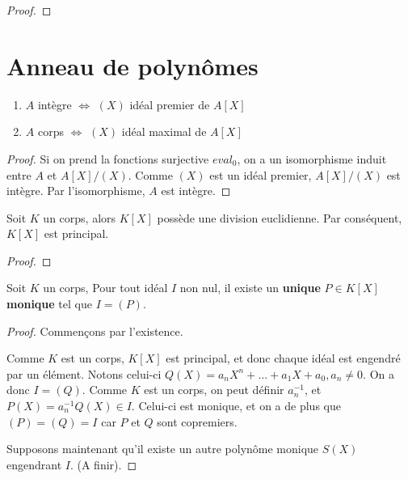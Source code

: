 \begin{proof}
	
\end{proof}
\section{Anneau de polynômes}

\begin{proposition}
	\begin{enumerate}
		\item $A$ intègre $\Leftrightarrow$ $(X)$ idéal premier de $A[X]$
		\item $A$ corps $\Leftrightarrow$ $(X)$ idéal maximal de $A[X]$
	\end{enumerate}
\end{proposition}

\begin{proof}
	Si on prend la fonctions surjective $eval_{0}$, on a un isomorphisme induit
	entre $A$ et $A[X]/(X)$. Comme $(X)$ est un idéal premier, $A[X]/(X)$ est
	intègre. Par l'isomorphisme, $A$ est intègre.
\end{proof}

\begin{proposition}
	Soit $K$ un corps, alors $K[X]$ possède une division euclidienne. Par
	conséquent, $K[X]$ est principal.
\end{proposition}

\begin{proof}
\end{proof}

\begin{proposition}
	Soit $K$ un corps,
	Pour tout idéal $I$ non nul, il existe un \textbf{unique} $P \in K[X]$
	\textbf{monique} tel que $I = (P)$.
\end{proposition}

\begin{proof}
	Commençons par l'existence.

	Comme $K$ est un corps, $K[X]$ est principal, et donc chaque idéal est
	engendré par un élément. Notons celui-ci $Q(X) = a_{n}X^{n} + \ldots +
	a_{1}X + a_{0}, a_{n} \ne 0$. On a donc $I = (Q)$. Comme $K$ est un corps, on peut
	définir $a_{n}^{-1}$, et $P(X) = a_{n}^{-1}Q(X) \in I$. Celui-ci est
	monique, et on a de plus que $(P) = (Q) = I$ car $P$ et $Q$ sont copremiers.
	
	Supposons maintenant qu'il existe un autre polynôme monique $S(X)$
	engendrant $I$. (A finir).
\end{proof}

